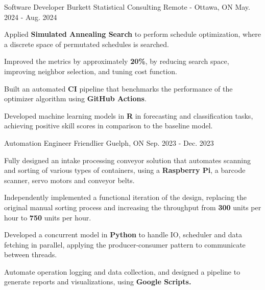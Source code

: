 

\begin{cventries}

\cventry
{Software Developer} %
{Burkett Statistical Consulting} %
{Remote - Ottawa, ON} %
{May. 2024 - Aug. 2024} %
{
  \begin{cvitems} %
    \item {Applied \textbf{Simulated Annealing Search} to perform schedule optimization, where a discrete space of permutated schedules is searched.}
    \item {Improved the metrics by approximately \textbf{20\%}, by reducing search space, improving neighbor selection, and tuning cost function.}
    \item {Built an automated \textbf{CI} pipeline that benchmarks the performance of the optimizer algorithm using \textbf{GitHub Actions}.}
    \item {Developed machine learning models in \textbf{R} in forecasting and classification tasks, achieving positive skill scores in comparison to the baseline model.}
  \end{cvitems}
}

\cventry
{Automation Engineer} %
{Friendlier} %
{Guelph, ON} %
{Sep. 2023 - Dec. 2023} %
{
  \begin{cvitems} %
    \item {Fully designed an intake processing conveyor solution that automates scanning and sorting of various types of containers, using a \textbf{Raspberry Pi}, a barcode scanner, servo motors and conveyor belts.}
    \item {Independently implemented a functional iteration of the design, replacing the original manual sorting process and increasing the throughput from \textbf{300} units per hour to \textbf{750} units per hour.}
    \item {Developed a concurrent model in \textbf{Python} to handle IO, scheduler and data fetching in parallel, applying the producer-consumer pattern to communicate between threads.}
    \item {Automate operation logging and data collection, and designed a pipeline to generate reports and visualizations, using \textbf{Google Scripts.}}
  \end{cvitems}
}


\end{cventries}
